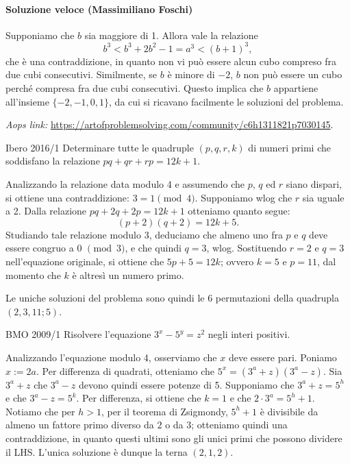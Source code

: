 \documentclass{article}
\begin{document}
\paragraph{Soluzione veloce (Massimiliano Foschi)}

Supponiamo che $b$ sia maggiore di 1. Allora vale
la relazione
\begin{equation*}
	b^3<b^3+2b^2-1=a^3<(b+1)^3,
\end{equation*}
che è una contraddizione, in quanto non vi può essere alcun cubo
compreso fra due cubi consecutivi.
Similmente, se $b$ è minore di $-2$, $b$ non può essere un cubo
perché compresa fra due cubi consecutivi. Questo implica che $b$ appartiene
all'insieme $\{-2,-1,0,1 \}$, da cui si ricavano facilmente le soluzioni del
problema.

\vspace{0.5cm}
\textit{Aops link:}
\href{https://artofproblemsolving.com/community/c6h1311821p7030145}
{https://artofproblemsolving.com/community/c6h1311821p7030145}.

\begin{proposition}{Ibero 2016/1}{}
	Determinare tutte le quadruple $(p,q,r,k)$ di numeri primi
	che soddisfano la relazione $pq+qr+rp=12k+1$.
\end{proposition}

Analizzando la relazione data modulo 4 e assumendo
che $p$, $q$ ed $r$ siano dispari, si ottiene una contraddizione:
$3=1 \pmod{4}$. Supponiamo wlog che $r$ sia uguale a 2.
Dalla relazione $pq+2q+2p=12k+1$ otteniamo quanto segue:
\begin{equation*}
	(p+2)(q+2)=12k+5.
\end{equation*}
Studiando tale relazione modulo 3, deduciamo che almeno uno fra
$p$ e $q$ deve essere congruo a 0 $\pmod{3}$, e che quindi
$q=3$, wlog.
Sostituendo $r=2$ e $q=3$ nell'equazione originale, si ottiene
che $5p+5=12k$; ovvero $k=5$ e $p=11$, dal momento che $k$ è
altresì un numero primo.

Le uniche soluzioni del problema sono quindi le
6 permutazioni della quadrupla $(2, 3, 11; 5)$.

\begin{proposition}{BMO 2009/1}{}
	Risolvere l'equazione $3^x-5^y=z^2$ negli interi positivi.
\end{proposition}

Analizzando l'equazione modulo 4, osserviamo che $x$ deve essere pari.
Poniamo $x:=2a$. Per differenza di quadrati, otteniamo che
$5^x=(3^a+z)(3^a-z)$. Sia $3^a+z$ che $3^a-z$ devono quindi essere
potenze di 5. Supponiamo che $3^a+z=5^h$ e che $3^a-z=5^k$.
Per differenza, si ottiene che $k=1$ e che $2\cdot 3^a=5^h+1$. Notiamo che
per $h>1$,
per il teorema di Zsigmondy, $5^h+1$ è divisibile da almeno un fattore primo
diverso da $2$ o da $3$; otteniamo quindi una contraddizione, in quanto
questi ultimi sono gli unici primi che possono dividere il LHS.
L'unica soluzione è dunque la terna $(2,1,2)$.
\end{document}

